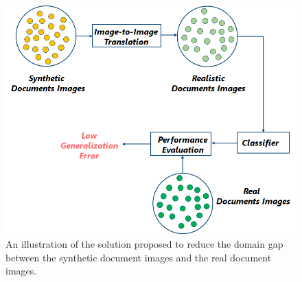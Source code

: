 \begin{figure}[H]
        \begin{center}
	    \includegraphics[scale=0.55]{images/Introduction/ProposedSolution.png}
	    \caption[An illustration of the solution proposed to reduce the domain gap between the synthetic document images and the real document images.]{An illustration of the solution proposed to reduce the domain gap between the synthetic document images and the real document images.}
	    \label{fig:ProposedSolution}
	    \end{center}
\end{figure}

\newpage

